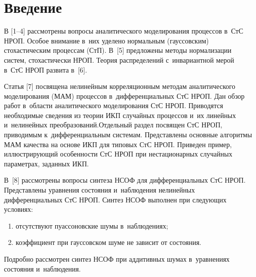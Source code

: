 
  



\thispagestyle{headings}

\begin{multicols}{2}

\label{st\stat}

\section{Введение}


В [1--4] рассмотрены вопросы аналитического моделирования процессов 
в~СтС НРОП. 
Особое внимание в~них уделено нормальным (гауссовским) стохастическим процессам 
(СтП). В~[5] предложены методы нормализации сис\-тем, стохастически НРОП. Теория распределений с~инвариантной мерой в~СтС НРОП 
развита в~[6].

Статья [7] посвящена нелинейным корреляционным методам аналитического 
моделирования (МАМ) процессов в~дифференциальных СтС НРОП. Дан обзор работ 
в~об\-ласти аналитического моделирования СтС НРОП. Приводятся необходимые сведения 
из теории ИКП случайных процессов и~их 
линейных и~нелинейных преобразований.\linebreak Отдельный раздел посвящен СтС НРОП, 
приводимым к~дифференциальным сис\-те\-мам. Представлены основные алгоритмы МАМ 
качества на основе ИКП для типовых СтС НРОП. Приведен \mbox{пример}, иллюстрирующий 
особенности СтС НРОП при нестационарных случайных параметрах, заданных ИКП.

В~[8] рассмотрены вопросы синтеза НСОФ для 
дифференциальных СтС НРОП. Представлены 
уравнения состояния и~наблюдения нелинейных дифференциальных СтС НРОП. 
Синтез НСОФ выполнен при следующих условиях:
\begin{enumerate}[(1)]
\item отсутствуют пуассоновские шумы в~наблюдениях; 
\item коэффициент при гауссовском 
шуме не зависит от состояния.
\end{enumerate}
 Подробно рассмотрен синтез НСОФ при аддитивных 
шумах в~уравнениях состояния и~наблюдения.


\end{multicols}
